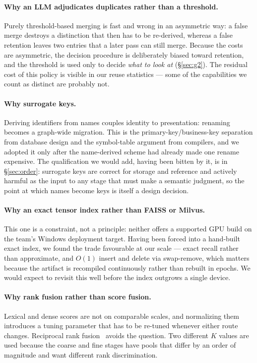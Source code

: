 \documentclass[10pt,a4paper]{article}
\begin{document}
\paragraph{Why an LLM adjudicates duplicates rather than a threshold.} Purely
threshold-based merging is fast and wrong in an asymmetric way: a false merge
destroys a distinction that then has to be re-derived, whereas a false retention
leaves two entries that a later pass can still merge. Because the costs are
asymmetric, the decision procedure is deliberately biased toward retention, and
the threshold is used only to decide \emph{what to look at}
(\S\ref{sec:g2}). The residual cost of this policy is visible in our reuse
statistics --- some of the capabilities we count as distinct are probably not.

\paragraph{Why surrogate keys.} Deriving identifiers from names couples identity
to presentation: renaming becomes a graph-wide migration. This is the
primary-key/business-key separation from database design and the symbol-table
argument from compilers, and we adopted it only after the name-derived scheme
had already made one rename expensive. The qualification we would add, having
been bitten by it, is in \S\ref{sec:order}: surrogate keys are correct for
storage and reference and actively harmful as the input to any stage that must
make a semantic judgment, so the point at which names become keys is itself a
design decision.

\paragraph{Why an exact tensor index rather than FAISS or Milvus.} This one is a
constraint, not a principle: neither offers a supported GPU build on the team's
Windows deployment target. Having been forced into a hand-built exact index, we
found the trade favourable at our scale --- exact recall rather than approximate,
and $O(1)$ insert and delete via swap-remove, which matters because the artifact
is recompiled continuously rather than rebuilt in epochs. We would expect to
revisit this well before the index outgrows a single device.

\paragraph{Why rank fusion rather than score fusion.} Lexical and dense scores
are not on comparable scales, and normalizing them introduces a tuning parameter
that has to be re-tuned whenever either route changes. Reciprocal rank
fusion~\cite{cormack2009rrf} avoids the question. Two different $K$ values are
used because the coarse and fine stages have pools that differ by an order of
magnitude and want different rank discrimination.
\end{document}
